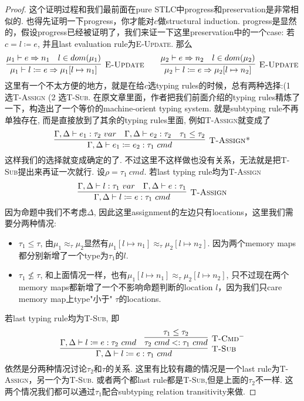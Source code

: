 \documentclass{article}
\newcommand{\termtype}[2]{\ensuremath{#1:#2}}
\begin{document}
\begin{proof}
\rm 这个证明过程和我们最前面在pure STLC中progress和preservation是非常相似的. 也得先证明一下progress，你才能对$c$做structural induction. progress是显然的，假设progress已经被证明了，我们来证一下这里preservation中的一个case: 若$c = l \coloneqq e$, 并且last evaluation rule为\textsc{E-Update}. 那么
\[
	\infer[\textsc{E-Update}]{\mu_1 \vdash l \coloneqq e \Rightarrow \mu_1[l \mapsto n_1]}{\mu_1 \vdash e \Rightarrow n_1 & l \in dom(\mu_1)} \quad\quad \infer[\textsc{E-Update}]{\mu_2 \vdash l \coloneqq e \Rightarrow \mu_2[l \mapsto n_2]}{\mu_2 \vdash e \Rightarrow n_2 & l \in dom(\mu_2)}
\]
这里有一个不太方便的地方，就是在给$c$选typing rules的时候，总有两种选择:(1 选\textsc{T-Assign} (2 选\textsc{T-Sub}. 在原文章\cite{DGC}里面，作者把我们前面介绍的typing rules精炼了一下，构造出了一个等价的machine-orient typing system. 就是subtyping rule不再单独存在, 而是直接放到了其余的typing rules里面, 例如\textsc{T-Assign}就变成了
\[
	\infer[\textsc{T-Assign*}]{\Gamma, \Delta \vdash \termtype{e_1 \coloneqq e_2}{\tau_1~cmd}}{\Gamma, \Delta \vdash \termtype{e_1}{\tau_2~var} & \Gamma, \Delta \vdash \termtype{e_2}{\tau_2} & \tau_1 \leq \tau_2}
\]
这样我们的选择就变成确定的了. 不过这里不这样做也没有关系，无法就是把\textsc{T-Sub}提出来再证一次就行. 设$\rho = \tau_1~cmd$. 若last typing rule均为\textsc{T-Assign}
\[
	\infer[\textsc{T-Assign}]{\Gamma, \Delta \vdash \termtype{l \coloneqq e}{\tau_1~cmd}}{\Gamma, \Delta \vdash \termtype{l}{\tau_1~var} & \Gamma, \Delta \vdash \termtype{e}{\tau_1}}	
\]
因为命题中我们不考虑$\Delta$, 因此这里assignment的左边只有locations，这里我们需要分两种情况:
\begin{itemize}
	\item $\tau_1 \leq \tau$, 由$\mu_1 \approx_\tau \mu_2$显然有$\mu_1[l \mapsto n_1]\approx_\tau \mu_2[l \mapsto n_2]$. 因为两个memory maps都分别新增了一个type为$\tau_1$的$l$.
	\item $\tau_1 \nleq \tau$, 和上面情况一样，也有$\mu_1[l \mapsto n_1]\approx_\tau \mu_2[l \mapsto n_2]$, 只不过现在两个memory maps都新增了一个不影响命题判断的location $l$，因为我们只care memory map上type"小于" $\tau$的locations.
\end{itemize}  

若last typing rule均为\textsc{T-Sub}, 即
\[
	\infer[\textsc{T-Sub}]{\Gamma, \Delta \vdash \termtype{l \coloneqq e}{\tau_1~cmd}}{\Gamma, \Delta \vdash \termtype{l \coloneqq e}{\tau_2~cmd} & \infer[\textsc{T-Cmd}^-]{\tau_2~cmd <: \tau_1~cmd}{\tau_1 \leq \tau_2}}
\]
依然是分两种情况讨论$\tau_2$和$\tau$的关系. 这里有比较有趣的情况是一个last rule为\textsc{T-Assign}，另一个为\textsc{T-Sub}. 或者两个都last rule都是\textsc{T-Sub},但是上面的$\tau_2$不一样. 这两个情况我们都可以通过$\tau_1$配合subtyping relation transitivity来做.
\end{proof}
\end{document}
